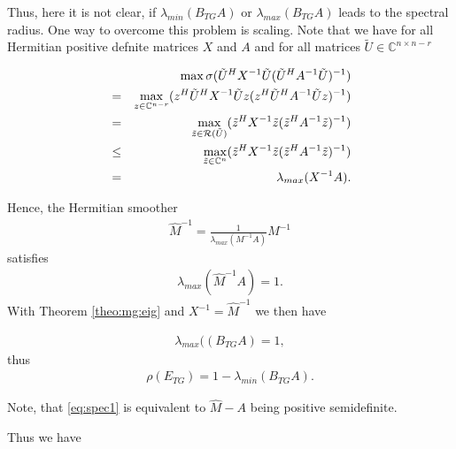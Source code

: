 \documentclass[final]{siamltex}
\newcommand{\innCnmr}{\in\mathbb{C}^{n-r}}
\newcommand{\beqo}{\begin{eqnarray*}}
\newcommand{\beq}{\begin{eqnarray}}
\newcommand{\eeqo}{\end{eqnarray*}}
\newcommand{\eeq}{\end{eqnarray}}
\numberwithin{equation}{section}
\newcommand{\ran} {{\cal R}}
\newcommand{\bCn}{\mathbb{C}^n}
\newcommand{\Cnnr}{\mathbb{C}^{n \times n-r}}
\begin{document}
Thus, here it is not clear, if $\lambda_{min}(B_{TG}A)$ or
$\lambda_{max}(B_{TG}A)$  leads to the spectral radius.
One way to overcome  this problem is scaling. Note that we  have for all
Hermitian positive defnite matrices $X$ and $A$ and for all matrices $\tilde U
\in \Cnnr$


\beqo
& &  \max \sigma(\tilde U^HX^{-1}\tilde U (\tilde U^HA^{-1}\tilde U)^{-1})\\
& = &  \max_{z \innCnmr} (z^H\tilde U^HX^{-1}\tilde Uz (z^H\tilde
U^HA^{-1}\tilde Uz)^{-1})\\
& = &  \max_{\tilde z \in {\ran (\tilde U)} } (\tilde z^HX^{-1}\tilde z (\tilde
z^HA^{-1}\tilde z)^{-1})\\
& \leq & \max_{\tilde z \in \bCn } (\tilde z^HX^{-1}\tilde z (\tilde
z^HA^{-1}\tilde z)^{-1})\\
& = & \lambda_{max}(X^{-1}A).
\eeqo

Hence, the  Hermitian smoother
\beqo
\hat M^{-1} = \frac{1}{\lambda_{max}(M^{-1}A)}M^{-1}
\eeqo
satisfies
\beq \label{eq:spec1}
\lambda_{max}(\hat M^{-1}A) = 1.
\eeq
With Theorem \ref{theo:mg:eig} and $X^{-1} = \hat M^{-1}$ we then have 

\beqo
\lambda_{max} ((B_{TG}A) = 1,
\eeqo
thus
\beqo
\rho(E_{TG}) = 1 - \lambda_{min } (B_{TG}A).
\eeqo

Note, that \eqref{eq:spec1} is equivalent to  $\hat M - A $ being positive
semidefinite.

Thus we  have 

\end{document}
